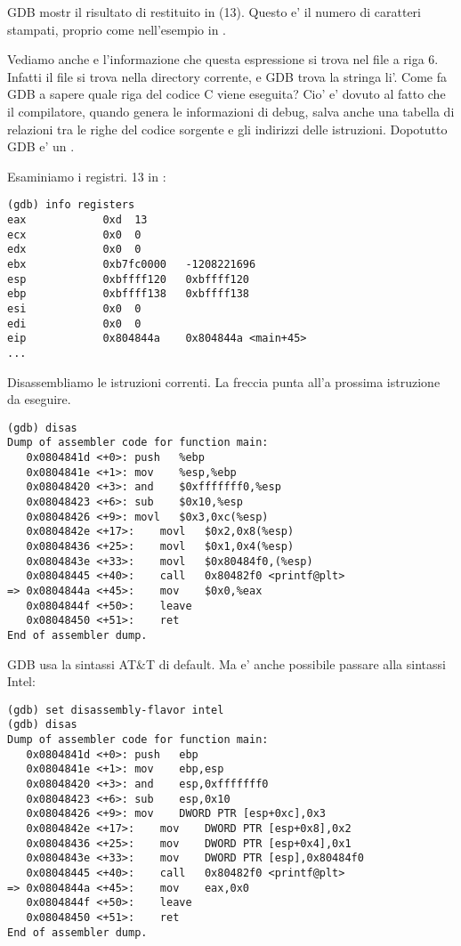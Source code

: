 \ac{GDB} mostr il risultato di \printf restituito in \EAX (13).
Questo e' il numero di caratteri stampati, proprio come nell'esempio in \olly.

Vediamo anche  e l'informazione che questa espressione si trova nel file  a riga 6.
Infatti il file  si trova nella directory corrente, e \ac{GDB} trova la stringa li'.
Come fa \ac{GDB} a sapere quale riga del codice C viene eseguita?
Cio' e' dovuto al fatto che il compilatore, quando genera le informazioni di debug, salva anche una tabella di relazioni tra le righe del
codice sorgente e gli indirizzi delle istruzioni.
Dopotutto GDB e' un .

Esaminiamo i registri.
13 in \EAX:

\begin{lstlisting}
(gdb) info registers
eax            0xd	13
ecx            0x0	0
edx            0x0	0
ebx            0xb7fc0000	-1208221696
esp            0xbffff120	0xbffff120
ebp            0xbffff138	0xbffff138
esi            0x0	0
edi            0x0	0
eip            0x804844a	0x804844a <main+45>
...
\end{lstlisting}

Disassembliamo le istruzioni correnti.
La freccia punta all'a prossima istruzione da eseguire.

\begin{lstlisting}
(gdb) disas
Dump of assembler code for function main:
   0x0804841d <+0>:	push   %ebp
   0x0804841e <+1>:	mov    %esp,%ebp
   0x08048420 <+3>:	and    $0xfffffff0,%esp
   0x08048423 <+6>:	sub    $0x10,%esp
   0x08048426 <+9>:	movl   $0x3,0xc(%esp)
   0x0804842e <+17>:	movl   $0x2,0x8(%esp)
   0x08048436 <+25>:	movl   $0x1,0x4(%esp)
   0x0804843e <+33>:	movl   $0x80484f0,(%esp)
   0x08048445 <+40>:	call   0x80482f0 <printf@plt>
=> 0x0804844a <+45>:	mov    $0x0,%eax
   0x0804844f <+50>:	leave  
   0x08048450 <+51>:	ret    
End of assembler dump.
\end{lstlisting}

\ac{GDB} usa la sintassi AT\&T di default.
Ma e' anche possibile passare alla sintassi Intel:

\begin{lstlisting}
(gdb) set disassembly-flavor intel
(gdb) disas
Dump of assembler code for function main:
   0x0804841d <+0>:	push   ebp
   0x0804841e <+1>:	mov    ebp,esp
   0x08048420 <+3>:	and    esp,0xfffffff0
   0x08048423 <+6>:	sub    esp,0x10
   0x08048426 <+9>:	mov    DWORD PTR [esp+0xc],0x3
   0x0804842e <+17>:	mov    DWORD PTR [esp+0x8],0x2
   0x08048436 <+25>:	mov    DWORD PTR [esp+0x4],0x1
   0x0804843e <+33>:	mov    DWORD PTR [esp],0x80484f0
   0x08048445 <+40>:	call   0x80482f0 <printf@plt>
=> 0x0804844a <+45>:	mov    eax,0x0
   0x0804844f <+50>:	leave  
   0x08048450 <+51>:	ret    
End of assembler dump.
\end{lstlisting}

